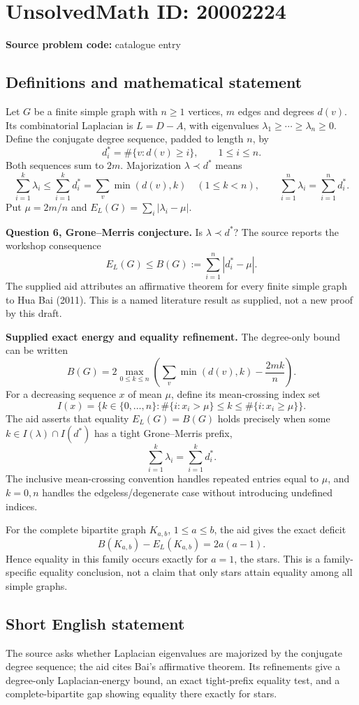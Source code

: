 \documentclass[11pt]{article}
\begin{document}
\section*{UnsolvedMath ID: 20002224}
\textbf{Source problem code:} catalogue entry
\subsection{Definitions and mathematical statement}
Let $G$ be a finite simple graph with $n\ge1$ vertices, $m$ edges and degrees $d(v)$. Its combinatorial Laplacian is $L=D-A$, with eigenvalues $\lambda_1\ge\cdots\ge\lambda_n\ge0$. Define the conjugate degree sequence, padded to length $n$, by
\[
 d_i^*=\#\{v:d(v)\ge i\},\qquad1\le i\le n.
\]
Both sequences sum to $2m$. Majorization $\lambda\prec d^*$ means
\[
 \sum_{i=1}^k\lambda_i\le\sum_{i=1}^kd_i^*
      =\sum_v\min(d(v),k)\quad(1\le k<n),
 \qquad\sum_{i=1}^n\lambda_i=\sum_{i=1}^nd_i^*.
\]
Put $\mu=2m/n$ and $E_L(G)=\sum_i|\lambda_i-\mu|$.

\textbf{Question 6, Grone--Merris conjecture.} Is $\lambda\prec d^*$? The source reports the workshop consequence
\[
 E_L(G)\le B(G):=\sum_{i=1}^n|d_i^*-\mu|.
\]
The supplied aid attributes an affirmative theorem for every finite simple graph to Hua Bai (2011). This is a named literature result as supplied, not a new proof by this draft.

\textbf{Supplied exact energy and equality refinement.} The degree-only bound can be written
\[
 B(G)=2\max_{0\le k\le n}
       \left(\sum_v\min(d(v),k)-\frac{2mk}{n}\right).
\]
For a decreasing sequence $x$ of mean $\mu$, define its mean-crossing index set
\[
 I(x)=\{k\in\{0,\ldots,n\}:\#\{i:x_i>\mu\}\le k
                              \le\#\{i:x_i\ge\mu\}\}.
\]
The aid asserts that equality $E_L(G)=B(G)$ holds precisely when some $k\in I(\lambda)\cap I(d^*)$ has a tight Grone--Merris prefix,
\[
 \sum_{i=1}^k\lambda_i=\sum_{i=1}^kd_i^*.
\]
The inclusive mean-crossing convention handles repeated entries equal to $\mu$, and $k=0,n$ handles the edgeless/degenerate case without introducing undefined indices.

For the complete bipartite graph $K_{a,b}$, $1\le a\le b$, the aid gives the exact deficit
\[
 B(K_{a,b})-E_L(K_{a,b})=2a(a-1).
\]
Hence equality in this family occurs exactly for $a=1$, the stars. This is a family-specific equality conclusion, not a claim that only stars attain equality among all simple graphs.
\subsection{Short English statement}
The source asks whether Laplacian eigenvalues are majorized by the conjugate degree sequence; the aid cites Bai's affirmative theorem. Its refinements give a degree-only Laplacian-energy bound, an exact tight-prefix equality test, and a complete-bipartite gap showing equality there exactly for stars.
\end{document}
